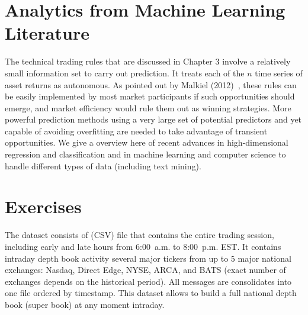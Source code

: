 \section{Analytics from Machine Learning Literature}


The technical trading rules that are discussed in Chapter 3 involve a relatively small information set to carry out prediction. It treats each of the $n$ time series of asset returns as autonomous. As pointed out by Malkiel (2012)~\cite{malkiel}, these rules can be easily implemented by most market participants if such opportunities should emerge, and market efficiency would rule them out as winning strategies. More powerful prediction methods using a very large set of potential predictors and yet capable of avoiding overfitting are needed to take advantage of transient opportunities. We give a overview here of recent advances in high-dimensional regression and classification and in machine learning and computer science to handle different types of data (including text mining).




\section{Exercises}


The dataset consists of (CSV) file that contains the entire trading session, including early and late hours from 6:00~a.m. to 8:00~p.m. EST. It contains intraday depth book activity several major tickers from up to 5 major national exchanges: Nasdaq, Direct Edge, NYSE, ARCA, and BATS (exact number of exchanges depends on the historical period). All messages are consolidates into one file ordered by timestamp. This dataset allows to build a full national depth book (super book) at any moment intraday. 

